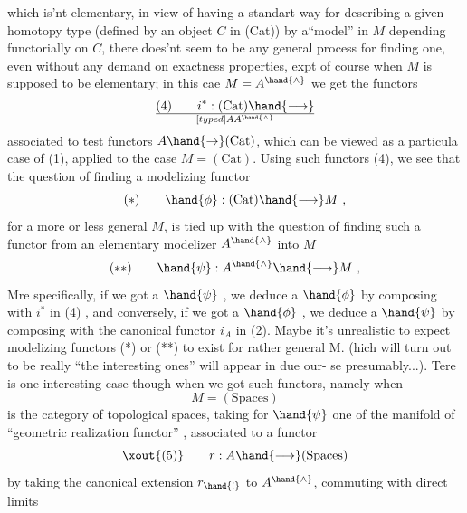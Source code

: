 which is'nt elementary,  in view of having a standart way for describing
a given homotopy type (defined by an object $C$ in (Cat)) by a``model'' in $M$
depending functorially on $C$,  there does'nt seem to be any general process
for finding one,  even without any demand on exactness properties,  expt
of course when $M$ is supposed to be elementary;   in this cae  $M = A^{\hand{\wedge}}$
we get  the functors
\[ (4) \qquad i^* : (\mathrm{Cat}) \hand{\longrightarrow} \over[typed]{A}{A}^{\hand{\wedge}} \]
associated to test functors $A \hand{\to} (\mathrm{Cat})$,  which can be viewed as a particula
case of (1),  applied to the case $M = (\mathrm{Cat})$.  Using  such functors
(4),  we see that the question of finding a modelizing functor
\[ (*) \qquad \hand{\phi} : (\mathrm{Cat}) \hand{\longrightarrow} M \ , \]
for a more or less general $M$,  is tied up with the question of finding
such a functor from an elementary modelizer $A^{\hand{\wedge}}$ into $M$
\[ (**) \qquad \hand{\psi} : A^{\hand{\wedge}} \hand{\longrightarrow} M \ , \]
Mre specifically,  if we got a $\hand{\psi}$ ,  we deduce a $\hand{\phi}$ by composing with
$i^*$ in (4) ,  and conversely,  if we got a $\hand{\phi}$ ,  we deduce a $\hand{\psi}$ by composing
with the canonical functor $i_A$ in (2).  Maybe it's unrealistic to expect
modelizing functors (*) or (**) to exist for rather general M. (hich  
will turn out to be really ``the interesting ones'' will appear in due our-%
se presumably...).  Tere is  one interesting case though when we got such
functors,  namely when
\[ M = (\mathrm{Spaces}) \]
is the category of topological spaces,  taking for $\hand{\psi}$ one of the manifold
  of ``geometric realization functor'' ,  associated to a  functor
\[ \xout{(5)} \qquad r : A \hand{\longrightarrow} (\mathrm{Spaces}) \]
by taking the canonical extension $r_{\hand{!}}$ to $A^{\hand{\wedge}}$,  commuting with direct limits
